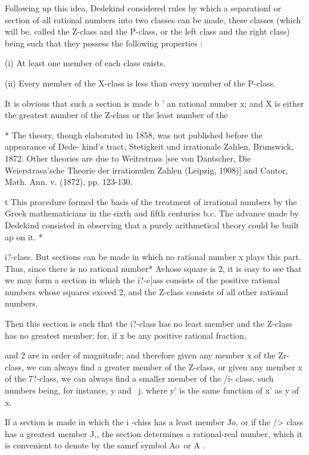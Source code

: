 Following up this idea, Dedekind considered rules by which a
separationf or section of all rational numbers into two classes can be
made, these classes (which will be. called the Z-class and the
P-class, or the left class and the right class) being such that they
possess the following properties :

(i) At least one member of each class exists.

(ii) Every member of the X-class is less than every member of the
P-class.

It is obvious that such a section is made b ' an rational number x;
and X is either the greatest number of the Z-class or the least number
of the

* The theory, though elaborated in 1858, was not published before the
appearance of Dede- kind's tract, Stetigkeit und irrationale Zahlen,
Brunswick, 1872. Other theories are due to Weitrstrass [see von
Dantscher, Die Weierstrasa'sche Theorie der irrationulen Zahlen
(Leipzig, 1908)] and Cantor, Math. Ann. v. (1872), pp. 123-130.

t This procedure formed the basis of the treatment of irrational
numbers by the Greek mathematicians in the sixth aud fifth centuries
b.c. The advance made by Dedekind consisted in observing that a purely
arithmetical theory could be built ap on it. *

%
%

i?-class. But sections can be made in which no rational number x plays
this part. Thus, since there is no rational number* Avhose square is
2, it is easy to see that we may form a section in which the i?-c]ass
consists of the positive rational numbers whose squares exceed 2, and
the Z-class consists of all other rational numbers.

Then this section is such that the i?-class has no least member and
the Z-class has no greatest member; for, if x be any positive
rational fraction,

and 2 are in order of magnitude; and therefore given any member x of
the Zr-class, we can always find a greater member of the Z-class, or
given any member x of the 7?-class, we can always find a smaller
member of the /i- class, such numbers being, for instance, y and \ j,
where y' is the same function of x' as y of x.

If a section is made in which the i -chiss has a least member Jo, or
if the /> class has a greatest member J,, the section determines a
rational-real number, which it is convenient to denote by the samef
symbol Ao\ or A .

